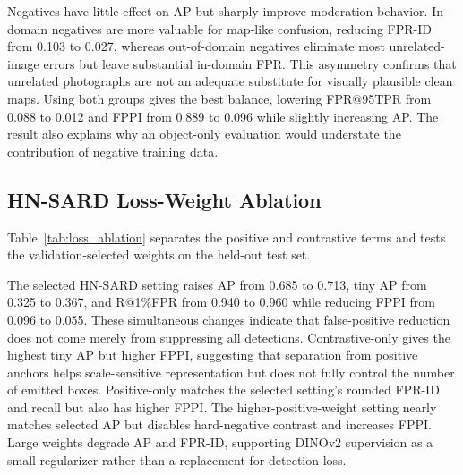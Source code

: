 \documentclass[conference,a4paper]{IEEEtran}
\begin{document}
Negatives have little effect on AP but sharply improve moderation behavior. In-domain negatives are more valuable for map-like confusion, reducing FPR-ID from 0.103 to 0.027, whereas out-of-domain negatives eliminate most unrelated-image errors but leave substantial in-domain FPR. This asymmetry confirms that unrelated photographs are not an adequate substitute for visually plausible clean maps. Using both groups gives the best balance, lowering FPR@95TPR from 0.088 to 0.012 and FPPI from 0.889 to 0.096 while slightly increasing AP. The result also explains why an object-only evaluation would understate the contribution of negative training data.

\subsection{HN-SARD Loss-Weight Ablation}
Table~\ref{tab:loss_ablation} separates the positive and contrastive terms and tests the validation-selected weights on the held-out test set.

\begin{table}[!t]
\centering
\caption{HN-SARD loss-weight ablation.}
\label{tab:loss_ablation}
\end{table}

The selected HN-SARD setting raises AP from 0.685 to 0.713, tiny AP from 0.325 to 0.367, and R@1\%FPR from 0.940 to 0.960 while reducing FPPI from 0.096 to 0.055. These simultaneous changes indicate that false-positive reduction does not come merely from suppressing all detections. Contrastive-only gives the highest tiny AP but higher FPPI, suggesting that separation from positive anchors helps scale-sensitive representation but does not fully control the number of emitted boxes. Positive-only matches the selected setting's rounded FPR-ID and recall but also has higher FPPI. The higher-positive-weight setting nearly matches selected AP but disables hard-negative contrast and increases FPPI. Large weights degrade AP and FPR-ID, supporting DINOv2 supervision as a small regularizer rather than a replacement for detection loss.
\end{document}
